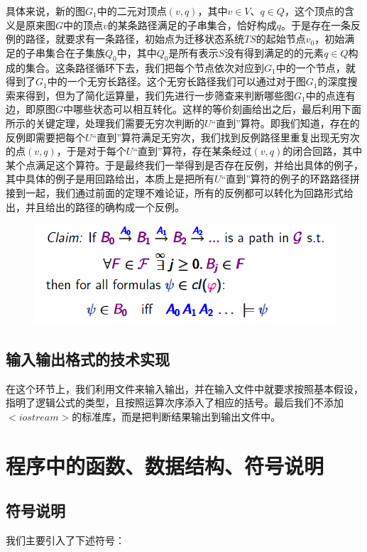 \documentclass[UTF8]{ctexart}
\begin{document}
具体来说，新的图$G_{1}$中的二元对顶点$(v, q)$，其中$v\in V$、$q\in Q$，这个顶点的含义是原来图$G$中的顶点$v$的某条路径满足的子串集合，恰好构成$q$。于是存在一条反例的路径，就要求有一条路径，初始点为迁移状态系统$TS$的起始节点$v_{0}$，初始满足的子串集合在子集族$Q_{0}$中，其中$Q_{0}$是所有表示$S$没有得到满足的的元素$q\in Q$构成的集合。这条路径循环下去，我们把每个节点依次对应到$G_{1}$中的一个节点，就得到了$G_{1}$中的一个无穷长路径。这个无穷长路径我们可以通过对于图$G_{1}$的深度搜索来得到，但为了简化运算量，我们先进行一步筛查来判断哪些图$G_{1}$中的点连有边，即原图$G$中哪些状态可以相互转化。这样的等价刻画给出之后，最后利用下面所示的关键定理，处理我们需要无穷次判断的$U$“直到”算符。即我们知道，存在的反例即需要把每个$U$“直到”算符满足无穷次，我们找到反例路径里重复出现无穷次的点$(v, q)$，于是对于每个$U$“直到”算符，存在某条经过$(v, q)$的闭合回路，其中某个点满足这个算符。于是最终我们一举得到是否存在反例，并给出具体的例子，其中具体的例子是用回路给出，本质上是把所有$U$“直到”算符的例子的环路路径拼接到一起，我们通过前面的定理不难论证，所有的反例都可以转化为回路形式给出，并且给出的路径的确构成一个反例。

\begin{figure}[htbp]
\centering
\includegraphics[scale=0.5]{Figure_1.png}
\end{figure}

\subsection{输入输出格式的技术实现} 
在这个环节上，我们利用文件来输入输出，并在输入文件中就要求按照基本假设，指明了逻辑公式的类型，且按照运算次序添入了相应的括号。最后我们不添加$<iostream>$的标准库，而是把判断结果输出到输出文件中。

\section{程序中的函数、数据结构、符号说明}

\subsection{符号说明}
我们主要引入了下述符号：
\end{document}
